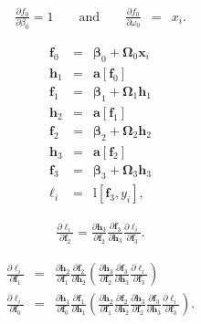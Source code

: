 \documentclass[letterpaper,twoside,openany, titlepage,oldfontcommands,titles,dvipsnames]{memoir}
\begin{document}
\begin{eqnarray}
 \frac{\partial f_{0}}{\partial \beta_{0}} = 1 \quad\quad\mbox{and}\quad \quad \frac{\partial f_{0}}{\partial \omega_{0}} &=& x_{i}.
 \end{eqnarray}

\begin{eqnarray}
  \mathbf{f}_{0} &=& \boldsymbol\beta_{0} +\boldsymbol\Omega_{0}\mathbf{x}_i\nonumber \\
  \mathbf{h}_{1} &=& \mathbf{a}[\mathbf{f}_{0}]\nonumber \\
  \mathbf{f}_{1} &=& \boldsymbol\beta_{1} +\boldsymbol\Omega_{1}\mathbf{h}_{1}\nonumber \\
  \mathbf{h}_{2} &=& \mathbf{a}[\mathbf{f}_{1}]\nonumber \\
  \mathbf{f}_{2} &=& \boldsymbol\beta_{2} +\boldsymbol\Omega_{2}\mathbf{h}_{2}\nonumber \\
  \mathbf{h}_{3} &=& \mathbf{a}[\mathbf{f}_{2}]\nonumber \\
  \mathbf{f}_{3}&=& \boldsymbol\beta_{3} +\boldsymbol\Omega_{3}\mathbf{h}_{3}\nonumber \\
  \ell_{i} &=& \mbox{l}[\mathbf{f}_{3},y_{i}],
 \end{eqnarray}

\begin{eqnarray}\label{eq:train2_backward1}
 \frac{\partial \ell_{i}}{\partial \mathbf{f}_{2}}=\frac{\partial \mathbf{h}_{3}}{\partial \mathbf{f}_{2}}\frac{\partial \mathbf{f}_3}{\partial \mathbf{h}_{3}} \frac{\partial \ell_{i}}{\partial \mathbf{f}_3}.
 \end{eqnarray}

\begin{eqnarray}\label{eq:train2_backward2}
 \frac{\partial \ell_{i}}{\partial \mathbf{f}_{1}}&=& \frac{\partial \mathbf{h}_{2}}{\partial \mathbf{f}_{1}}\frac{\partial \mathbf{f}_{2}}{\partial \mathbf{h}_{2}}
 \left(\frac{\partial \mathbf{h}_{3}}{\partial \mathbf{f}_{2}}\frac{\partial \mathbf{f}_3}{\partial \mathbf{h}_{3}} \frac{\partial \ell_{i}}{\partial \mathbf{f}_3}\right)  \\
 \frac{\partial \ell_{i}}{\partial \mathbf{f}_{0}}&=&\frac{\partial \mathbf{h}_{1}}{\partial \mathbf{f}_{0}}\frac{\partial \mathbf{f}_{1}}{\partial \mathbf{h}_{1}}\left(\frac{\partial \mathbf{h}_{2}}{\partial \mathbf{f}_{1}}\frac{\partial \mathbf{f}_{2}}{\partial \mathbf{h}_{2}}
 \frac{\partial \mathbf{h}_{3}}{\partial \mathbf{f}_{2}}\frac{\partial \mathbf{f}_3}{\partial \mathbf{h}_{3}} \frac{\partial \ell_{i}}{\partial \mathbf{f}_3}\right).\label{eq:train2_backward2a}
 \end{eqnarray}
\end{document}
